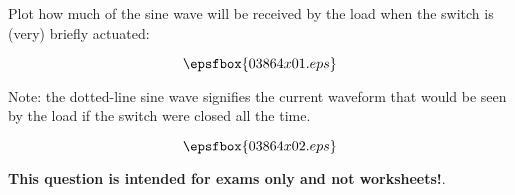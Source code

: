 

Plot how much of the sine wave will be received by the load when the switch is (very) briefly actuated:

$$\epsfbox{03864x01.eps}$$

Note: the dotted-line sine wave signifies the current waveform that would be seen by the load if the switch were closed all the time.







$$\epsfbox{03864x02.eps}$$







{\bf This question is intended for exams only and not worksheets!}.



